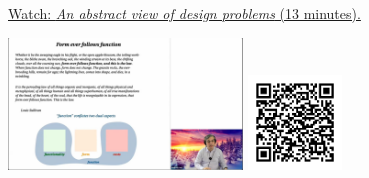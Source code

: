 
\begin{minipage}{10cm}
    \href{https://act4e-spring21.netlify.app/videos/spring2021-design:design:abstract-view-dp.html}{Watch: \emph{An abstract view of design problems} (13 minutes).}
        
    \href{https://act4e-spring21.netlify.app/videos/spring2021-design:design:abstract-view-dp.html}{\includegraphics[height=3.5cm]{spring2021-design:design:abstract-view-dp/thumbnails.jpg}}
    \href{https://act4e-spring21.netlify.app/videos/spring2021-design:design:abstract-view-dp.html}{\includegraphics[height=2.5cm]{spring2021-design:design:abstract-view-dp/qrcode.png}}
\end{minipage}
